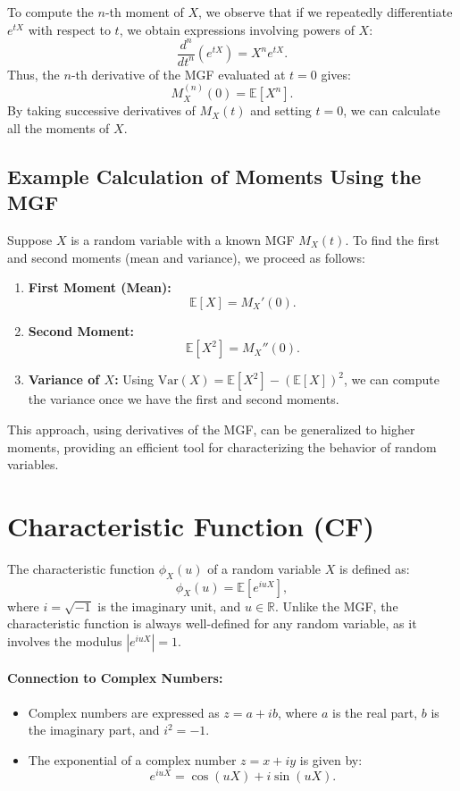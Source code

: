To compute the \( n \)-th moment of \( X \), we observe that if we repeatedly differentiate \( e^{tX} \) with respect to \( t \), we obtain expressions involving powers of \( X \):
\[
\frac{d^n}{dt^n} \left( e^{tX} \right) = X^n e^{tX}.
\]
Thus, the \( n \)-th derivative of the MGF evaluated at \( t = 0 \) gives:
\[
M_X^{(n)}(0) = \mathbb{E}\left[ X^n \right].
\]
By taking successive derivatives of \( M_X(t) \) and setting \( t = 0 \), we can calculate all the moments of \( X \).

\subsection{Example Calculation of Moments Using the MGF}

Suppose \( X \) is a random variable with a known MGF \( M_X(t) \). To find the first and second moments (mean and variance), we proceed as follows:
\begin{enumerate}
    \item \textbf{First Moment (Mean):}
   \[
   \mathbb{E}[X] = M_X'(0).
   \]
    \item \textbf{Second Moment:}
   \[
   \mathbb{E}[X^2] = M_X''(0).
   \]
    \item \textbf{Variance of \( X \):}
   Using \( \mathrm{Var}(X) = \mathbb{E}[X^2] - (\mathbb{E}[X])^2 \), we can compute the variance once we have the first and second moments.
\end{enumerate}
This approach, using derivatives of the MGF, can be generalized to higher moments, providing an efficient tool for characterizing the behavior of random variables.

\section{Characteristic Function (CF)}

The characteristic function \( \phi_X(u) \) of a random variable \( X \) is defined as:
\[
\phi_X(u) = \mathbb{E}\left[e^{i u X}\right],
\]
where \( i = \sqrt{-1} \) is the imaginary unit, and \( u \in \mathbb{R} \). Unlike the MGF, the characteristic function is always well-defined for any random variable, as it involves the modulus \( |e^{i u X}| = 1 \). \newline
\paragraph{Connection to Complex Numbers:}
\begin{itemize}
    \item Complex numbers are expressed as \( z = a + i b \), where \( a \) is the real part, \( b \) is the imaginary part, and \( i^2 = -1 \).
    \item The exponential of a complex number \( z = x + i y \) is given by:
\[
e^{i u X} = \cos(uX) + i \sin(uX).
\]
\end{itemize}
